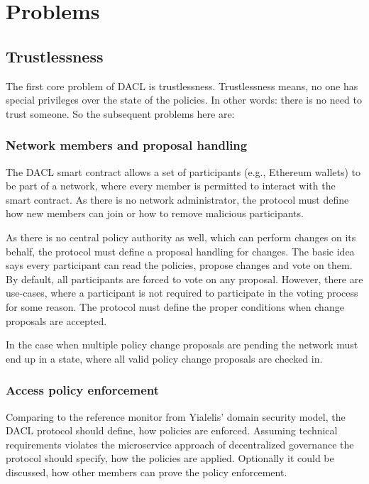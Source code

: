 \documentclass[12pt, conference]{IEEEtran}
\begin{document}
\section{Problems}



\subsection{Trustlessness}

The first core problem of DACL is trustlessness. Trustlessness means, no one has special privileges over the state of the policies.  In other words: there is no need to trust someone. So the subsequent problems here are: \\

\subsubsection{Network members and proposal handling}

The DACL smart contract allows a set of participants (e.g., Ethereum wallets) to be part of a network, where every member is permitted to interact with the smart contract. As there is no network administrator, the protocol must define how new members can join or how to remove malicious participants. 

As there is no central policy authority as well, which can perform changes on its behalf, the protocol must define a proposal handling for changes. The basic idea says every participant can read the policies, propose changes and vote on them. By default, all participants are forced to vote on any proposal. However, there are use-cases, where a participant is not required to participate in the voting process for some reason. The protocol must define the proper conditions when change proposals are accepted.

In the case when multiple policy change proposals are pending the network must end up in a state, where all valid policy change proposals are checked in.

\subsubsection{Access policy enforcement}

Comparing to the reference monitor from Yialelis' domain security model, the DACL protocol should define, how policies are enforced. Assuming technical requirements violates the microservice approach of decentralized governance the protocol should specify, how the policies are applied. Optionally it could be discussed, how other members can prove the policy enforcement.
\end{document}
